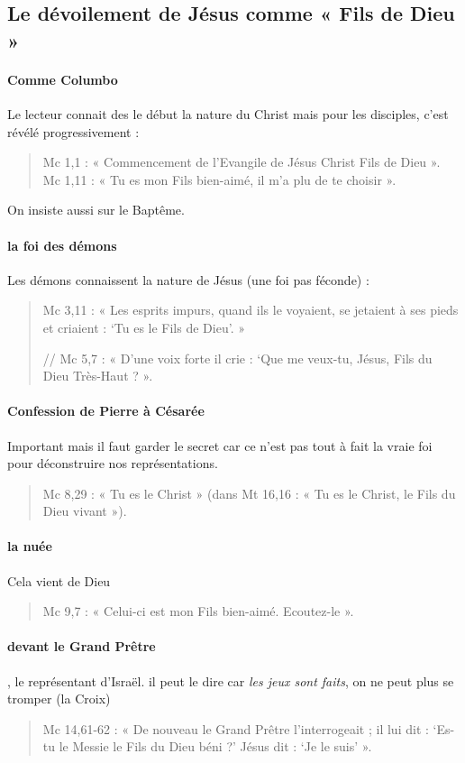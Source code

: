     \subsection{Le dévoilement de Jésus comme « Fils de Dieu »}
    \paragraph{Comme Columbo} Le lecteur connait des le début la nature du Christ mais pour les disciples, c'est révélé progressivement : 
   
     \begin{quote}
         Mc 1,1 : « Commencement de l'Evangile de Jésus Christ Fils de Dieu ». Mc
1,11 : « Tu es mon Fils bien-aimé, il m'a plu de te choisir ».
     \end{quote}
On insiste aussi sur le Baptême.
\paragraph{la foi des démons} Les démons connaissent la nature de Jésus (une foi pas féconde) : 
\begin{quote}
    Mc 3,11 : « Les esprits impurs, quand ils le voyaient, se jetaient à ses
pieds et criaient : `Tu es le Fils de Dieu'. » 

// Mc 5,7 : « D'une voix
forte il crie : `Que me veux-tu, Jésus, Fils du Dieu Très-Haut ? ».
\end{quote}
\paragraph{Confession de Pierre à Césarée} Important mais il faut garder le secret car ce n'est pas tout à fait la vraie foi pour déconstruire nos représentations.
\begin{quote}
   Mc
8,29 : « Tu es le Christ » (dans Mt 16,16 : « Tu es le Christ, le Fils
du Dieu vivant »).  
\end{quote}
\paragraph{la nuée} Cela vient de Dieu
\begin{quote}
    Mc 9,7 : « Celui-ci est mon Fils bien-aimé. Ecoutez-le ».

\end{quote}

\paragraph{devant le Grand Prêtre}, le représentant d'Israël. il peut le dire car \textit{les jeux sont faits}, on ne peut plus se tromper (la Croix)
\begin{quote}
    Mc 14,61-62 : « De nouveau le Grand Prêtre l'interrogeait ; il lui dit :
`Es-tu le Messie le Fils du Dieu béni ?' Jésus dit : `Je le suis' ».
\end{quote}
